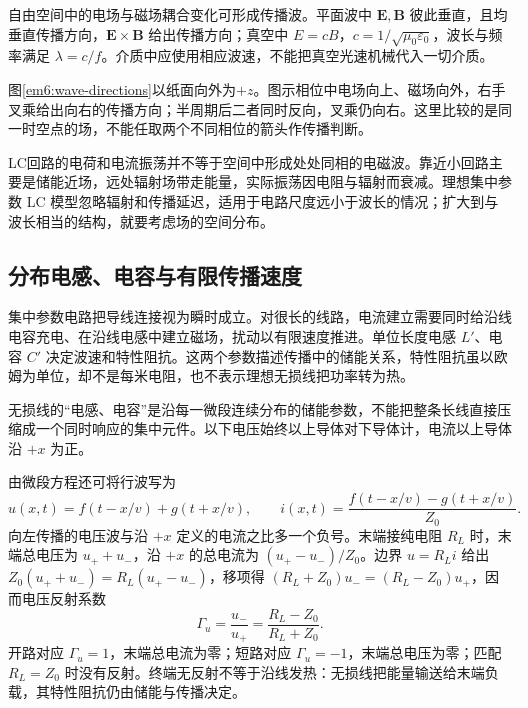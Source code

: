 自由空间中的电场与磁场耦合变化可形成传播波。平面波中 $\bm E,\bm B$ 彼此垂直，且均垂直传播方向，$\bm E\times\bm B$ 给出传播方向；真空中 $E=cB$，$c=1/\sqrt{\mu_0\varepsilon_0}$，波长与频率满足 $\lambda=c/f$。介质中应使用相应波速，不能把真空光速机械代入一切介质。

图\ref{em6:wave-directions}以纸面向外为$+z$。图示相位中电场向上、磁场向外，右手叉乘给出向右的传播方向；半周期后二者同时反向，叉乘仍向右。这里比较的是同一时空点的场，不能任取两个不同相位的箭头作传播判断。

LC回路的电荷和电流振荡并不等于空间中形成处处同相的电磁波。靠近小回路主要是储能近场，远处辐射场带走能量，实际振荡因电阻与辐射而衰减。理想集中参数 LC 模型忽略辐射和传播延迟，适用于电路尺度远小于波长的情况；扩大到与波长相当的结构，就要考虑场的空间分布。


\subsection{分布电感、电容与有限传播速度}

集中参数电路把导线连接视为瞬时成立。对很长的线路，电流建立需要同时给沿线电容充电、在沿线电感中建立磁场，扰动以有限速度推进。单位长度电感 $L'$、电容 $C'$ 决定波速和特性阻抗。这两个参数描述传播中的储能关系，特性阻抗虽以欧姆为单位，却不是每米电阻，也不表示理想无损线把功率转为热。


无损线的“电感、电容”是沿每一微段连续分布的储能参数，不能把整条长线直接压缩成一个同时响应的集中元件。以下电压始终以上导体对下导体计，电流以上导体沿 $+x$ 为正。






由微段方程还可将行波写为
\[u(x,t)=f(t-x/v)+g(t+x/v),\qquad
i(x,t)=\frac{f(t-x/v)-g(t+x/v)}{Z_0}.\]
向左传播的电压波与沿 $+x$ 定义的电流之比多一个负号。末端接纯电阻 $R_L$ 时，末端总电压为 $u_++u_-$，沿 $+x$ 的总电流为 $(u_+-u_-)/Z_0$。边界 $u=R_Li$ 给出
$Z_0(u_++u_-)=R_L(u_+-u_-)$，移项得
$(R_L+Z_0)u_-=(R_L-Z_0)u_+$，因而电压反射系数
\[\Gamma_u=\frac{u_-}{u_+}=\frac{R_L-Z_0}{R_L+Z_0}.\]
开路对应 $\Gamma_u=1$，末端总电流为零；短路对应 $\Gamma_u=-1$，末端总电压为零；匹配 $R_L=Z_0$ 时没有反射。终端无反射不等于沿线发热：无损线把能量输送给末端负载，其特性阻抗仍由储能与传播决定。
